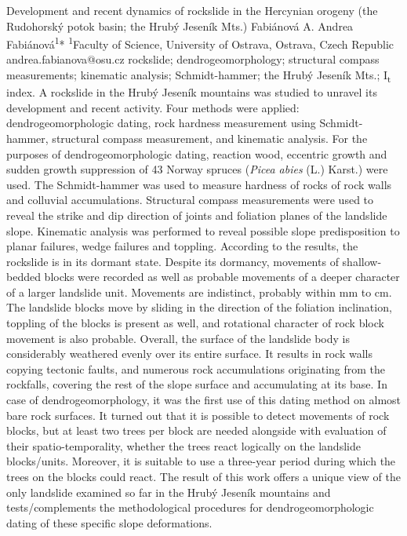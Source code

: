 \abstract
{Development and recent dynamics of rockslide in the Hercynian orogeny (the Rudohorský potok basin; the Hrubý Jeseník Mts.)} 
{Fabiánová A.} 
{Andrea Fabiánová\textsuperscript{1}*} 
{\POtag} 
{
\textsuperscript{1}Faculty of Science, University of Ostrava, Ostrava, Czech Republic
}
{andrea.fabianova@osu.cz}  %
{rockslide; dendrogeomorphology; structural compass measurements; kinematic analysis; Schmidt-hammer; the Hrubý Jeseník Mts.; I\textsubscript{t} index.}
{A rockslide in the Hrubý Jeseník mountains was studied to unravel its development and recent activity. Four methods were applied: dendrogeomorphologic dating, rock hardness measurement using Schmidt-hammer, structural compass measurement, and kinematic analysis. For the purposes of dendrogeomorphologic dating, reaction wood, eccentric growth and sudden growth suppression of 43 Norway spruces (\textit{Picea abies} (L.) Karst.) were used. The Schmidt-hammer was used to measure hardness of rocks of rock walls and colluvial accumulations. Structural compass measurements were used to reveal the strike and dip direction of joints and foliation planes of the landslide slope. Kinematic analysis was performed to reveal possible slope predisposition to planar failures, wedge failures and toppling. According to the results, the rockslide is in its dormant state. Despite its dormancy, movements of shallow-bedded blocks were recorded as well as probable movements of a deeper character of a larger landslide unit. Movements are indistinct, probably within mm to cm. The landslide blocks move by sliding in the direction of the foliation inclination, toppling of the blocks is present as well, and rotational character of rock block movement is also probable. Overall, the surface of the landslide body is considerably weathered evenly over its entire surface. It results in rock walls copying tectonic faults, and numerous rock accumulations originating from the rockfalls, covering the rest of the slope surface and accumulating at its base. In case of dendrogeomorphology, it was the first use of this dating method on almost bare rock surfaces. It turned out that it is possible to detect movements of rock blocks, but at least two trees per block are needed alongside with evaluation of their spatio-temporality, whether the trees react logically on the landslide blocks/units. Moreover, it is suitable to use a three-year period during which the trees on the blocks could react. The result of this work offers a unique view of the only landslide examined so far in the Hrubý Jeseník mountains and tests/complements the methodological procedures for dendrogeomorphologic dating of these specific slope deformations.
}
{
}

